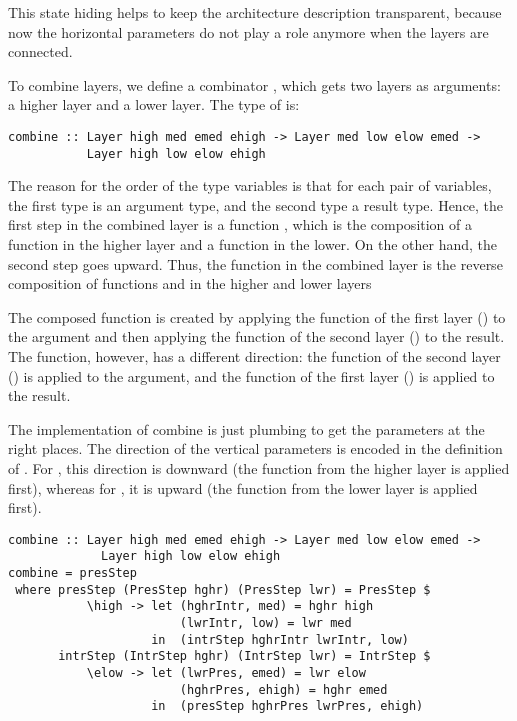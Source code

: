 \documentclass[preprint,natbib]{sigplanconf}
\begin{document}
\bc This state hiding helps to keep the architecture description transparent, because now the horizontal parameters do not play a role anymore when the layers are connected.
\ec


To combine layers, we define a combinator , which gets two layers as arguments: a higher layer and a lower layer. The type of  is:

\begin{small}
\begin{verbatim}
combine :: Layer high med emed ehigh -> Layer med low elow emed -> 
           Layer high low elow ehigh
\end{verbatim}
\end{small}

The reason for the order of the type variables is that for each pair of variables, the first type is an argument type, and the second type  a result type. Hence, the first step in the combined layer is a function , which is the composition of a function  in the higher layer and a function  in the lower. On the other hand, the second step goes upward.  Thus, the function  in the combined layer is the reverse composition of functions  and  in the higher and lower layers
  
\bc The composed  function is created by applying the  function of the first layer () to the  argument and then applying the  function of the second layer () to the result. The  function, however, has a different direction: the  function of the second layer () is applied to the argument, and the  function of the first layer () is applied to the result. \ec

The implementation of combine is just plumbing to get the parameters at the right places. The direction of the vertical parameters is encoded in the definition of . \bc For , this direction is downward (the function from the higher layer is applied first), whereas for , it is upward (the function from the lower layer is applied first). \ec


\begin{small}
\begin{verbatim}
combine :: Layer high med emed ehigh -> Layer med low elow emed -> 
             Layer high low elow ehigh
combine = presStep
 where presStep (PresStep hghr) (PresStep lwr) = PresStep $ 
           \high -> let (hghrIntr, med) = hghr high
                        (lwrIntr, low) = lwr med
                    in  (intrStep hghrIntr lwrIntr, low)
       intrStep (IntrStep hghr) (IntrStep lwr) = IntrStep $
           \elow -> let (lwrPres, emed) = lwr elow
                        (hghrPres, ehigh) = hghr emed
                    in  (presStep hghrPres lwrPres, ehigh)
\end{verbatim}
\end{small}
\end{document}
